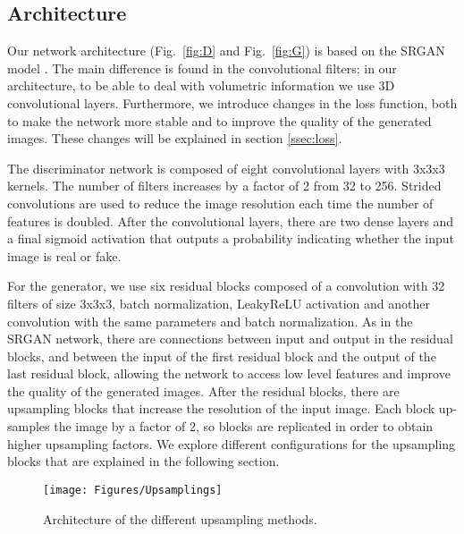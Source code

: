 \documentclass{article}
\begin{document}
\subsection{Architecture}
\label{ssec:arch}

Our network architecture (Fig.~\ref{fig:D} and Fig.~\ref{fig:G}) is based on the SRGAN model \cite{ledig:srgan}. The main difference is found in the convolutional filters; in our architecture, to be able to deal with volumetric information we use 3D convolutional layers. Furthermore, we introduce changes in the loss function, both to make the network more stable and to improve the quality of the generated images. These changes will be explained in section \ref{ssec:loss}.

The discriminator network is composed of eight convolutional layers with 3x3x3 kernels. The number of filters increases by a factor of 2 from 32 to 256. Strided convolutions are used to reduce the image resolution each time the number of features is doubled. After the convolutional layers, there are two dense layers and a final sigmoid activation that outputs a probability indicating whether the input image is real or fake.

For the generator, we use six residual blocks composed of a convolution with 32 filters of size 3x3x3, batch normalization, LeakyReLU activation and another convolution with the same parameters and batch normalization. As in the SRGAN network, there are connections between input and output in the residual blocks, and between the input of the first residual block and the output of the last residual block, allowing the network to access low level features and improve the quality of the generated images.
After the residual blocks, there are upsampling blocks that increase the resolution of the input image. Each block up-samples the image by a factor of 2, so blocks are replicated in order to obtain higher upsampling factors. We explore different configurations for the upsampling blocks that are explained in the following section.

\begin{figure*}
   \texttt{[image: Figures/Upsamplings]}
   \caption{Architecture of the different upsampling methods.}
	\label{fig:Upsamplings}
\end{figure*}
\end{document}
